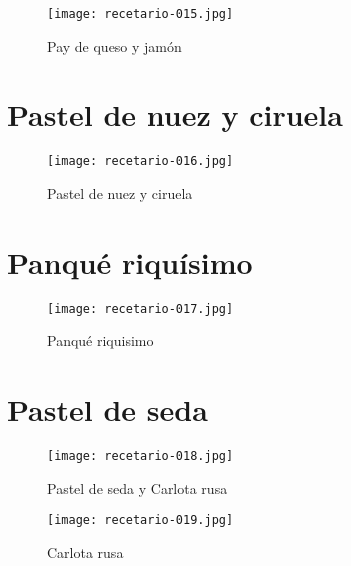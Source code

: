 \documentclass[12pt,letterpaper]{article}
\begin{document}
    \begin{figure}[H]
      \vspace{2pt}
    \texttt{[image: recetario-015.jpg]}
      \caption{Pay de queso y jamón}
      
    \end{figure}


\newpage

  \section{Pastel de nuez y ciruela}
  
    \begin{figure}[H]
      \vspace{2pt}
    \texttt{[image: recetario-016.jpg]}
      \caption{Pastel de nuez y ciruela}
      
    \end{figure}

\newpage

  \section{Panqué riquísimo}
  
    \begin{figure}[H]
      \vspace{2pt}
    \texttt{[image: recetario-017.jpg]}
      \caption{Panqué riquisimo}
      
    \end{figure}

\newpage

  \section{Pastel de seda}
  
    \begin{figure}[H]
      \vspace{2pt}
    \texttt{[image: recetario-018.jpg]}
      \caption{Pastel de seda y Carlota rusa}
      
    \end{figure}


  \begin{figure}[H]
    \vspace{2pt}
  \texttt{[image: recetario-019.jpg]}
    \caption{Carlota rusa}
    
  \end{figure}
\end{document}
